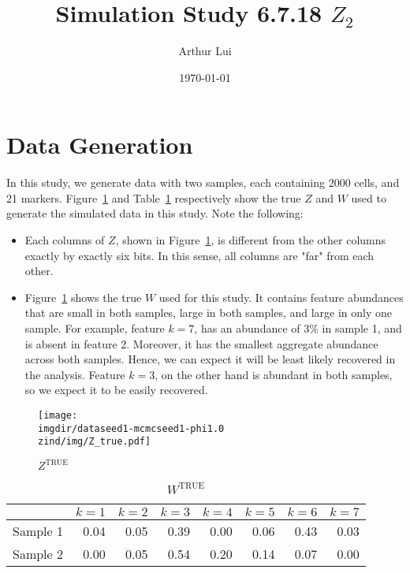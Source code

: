 \documentclass[10pt]{article} %
\title{Simulation Study 6.7.18 $Z_2$}
\author{Arthur Lui}
\date{\today} %
\def\true{\text{TRUE}}
\def\imgdir{../../../results/test-sim-6-7-18}
\def\zind{-Zind2}
\begin{document}
\maketitle



\section{Data Generation}\label{sec:data-generation}
In this study, we generate data with two samples, each containing 2000 cells,
and 21 markers. Figure~\ref{fig:Z-true} and Table~\ref{tab:W-true}
respectively show the true $Z$ and $W$ used to generate the simulated data in
this study. Note the following:
\begin{itemize}
  \item Each columns of $Z$, shown in Figure~\ref{fig:Z-true}, is different
    from the other columns exactly by exactly six bits. In this sense, all
    columns are "far" from each other.
  \item Figure~\ref{tab:W-true} shows the true $W$ used for this study. It
    contains feature abundances that are small in both samples, large in both
    samples, and large in only one sample. For example, feature $k=7$, 
    has an abundance of $3\%$ in sample 1, and is absent in feature 2. 
    Moreover, it has the smallest aggregate abundance across both samples. 
    Hence, we can expect it will be least likely recovered in the analysis. 
    Feature $k=3$, on the other hand is abundant in both samples, so we expect
    it to be easily recovered.
\end{itemize}

\begin{figure}[H]
  \begin{center}  %
    \texttt{[image: \\imgdir/dataseed1-mcmcseed1-phi1.0\\zind/img/Z\_true.pdf]}
  \end{center}
  \caption{$Z^\true$}
  \label{fig:Z-true}
\end{figure}

\begin{table}[ht]
  \centering
  \begin{tabular}{rrrrrrrr}
    \hline
    & $k=1$ & $k=2$ & $k=3$ & $k=4$ & $k=5$ & $k=6$ & $k=7$ \\
    \hline
    Sample 1 & 0.04 & 0.05 & 0.39 & 0.00 & 0.06 & 0.43 & 0.03 \\
    Sample 2 & 0.00 & 0.05 & 0.54 & 0.20 & 0.14 & 0.07 & 0.00 \\
    \hline
  \end{tabular}
  \caption{$W^\true$}
  \label{tab:W-true}
\end{table}
\end{document}
